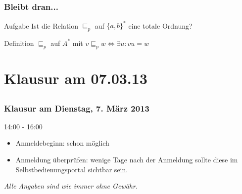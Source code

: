 \subsection*{}
\begin{frame}
  \frametitle{Bleibt dran...}

	\begin{block}{Aufgabe}
		Ist die Relation $\sqsubseteq_p$ auf $ \{a, b\}^* $ eine totale Ordnung?
	\end{block}
	
	\begin{block}{Definition}
		$\sqsubseteq_p$ auf $A^*$ mit $v\sqsubseteq_p w \Leftrightarrow \exists u: vu=w$
	\end{block}
\end{frame}

\section[Klausur]{Klausur am 07.03.13}
\subsection*{}
\begin{frame}
	\frametitle{Klausur am Dienstag, 7. März 2013}
	\begin{block}{14:00 - 16:00}
		\begin{itemize}
			\item Anmeldebeginn: schon möglich
			\item Anmeldung überprüfen: wenige Tage nach der Anmeldung sollte diese im Selbstbedienungsportal sichtbar sein.
		\end{itemize}
  	\end{block}
  	\textit{Alle Angaben sind wie immer ohne Gewähr.}
\end{frame}

